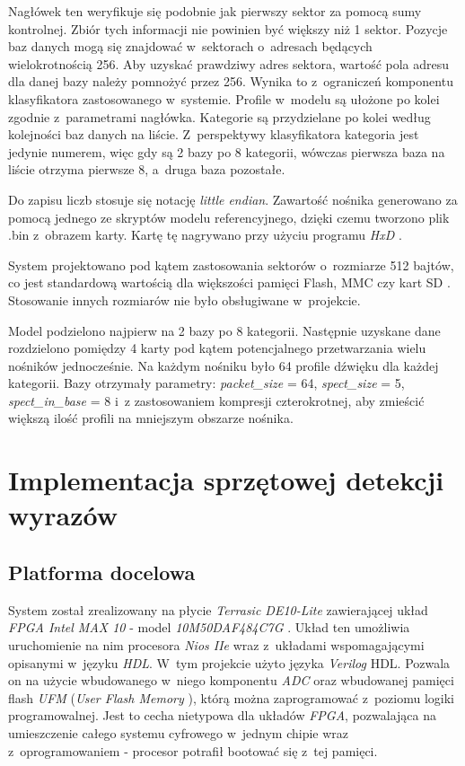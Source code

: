 Nagłówek ten weryfikuje się podobnie jak pierwszy sektor za pomocą sumy kontrolnej. Zbiór tych informacji nie powinien być większy niż 1 sektor. Pozycje baz danych mogą się znajdować w~sektorach o~adresach będących wielokrotnością 256. Aby uzyskać prawdziwy adres sektora, wartość pola adresu dla danej bazy należy pomnożyć przez 256. Wynika to z~ograniczeń komponentu klasyfikatora zastosowanego w~systemie. Profile w~modelu są ułożone po kolei zgodnie z~parametrami nagłówka. Kategorie są przydzielane po kolei według kolejności baz danych na liście. Z~perspektywy klasyfikatora kategoria jest jedynie numerem, więc gdy są 2 bazy po 8 kategorii, wówczas pierwsza baza na liście otrzyma pierwsze 8, a~druga baza pozostałe.

Do zapisu liczb stosuje się notację \textit{little endian}. Zawartość nośnika generowano za pomocą jednego ze skryptów modelu referencyjnego, dzięki czemu tworzono plik .bin z~obrazem karty. Kartę tę nagrywano przy użyciu programu \textit{HxD} \cite{HxD}.

System projektowano pod kątem zastosowania sektorów o~rozmiarze 512 bajtów, co jest standardową wartością dla większości pamięci Flash, MMC czy kart SD \cite{karty:SD}\cite{karty:EMMC}. Stosowanie innych rozmiarów nie było obsługiwane w~projekcie.

Model podzielono najpierw na 2 bazy po 8 kategorii. Następnie uzyskane dane rozdzielono pomiędzy 4 karty pod kątem potencjalnego przetwarzania wielu nośników jednocześnie. Na każdym nośniku było 64 profile dźwięku dla każdej kategorii. Bazy otrzymały parametry: \textit{packet\_size} = 64, \textit{spect\_size} = 5, \textit{spect\_in\_base} = 8 i~z zastosowaniem kompresji czterokrotnej, aby zmieścić większą ilość profili na mniejszym obszarze nośnika.

\newpage
\section{Implementacja sprzętowej detekcji wyrazów}

\subsection{Platforma docelowa}

System został zrealizowany na płycie \textit{Terrasic DE10-Lite} zawierającej układ \textit{FPGA Intel MAX 10} - model \textit{10M50DAF484C7G} \cite{Intel:MAX}. Układ ten umożliwia uruchomienie na nim procesora \textit{Nios IIe} wraz z~układami wspomagającymi opisanymi w~języku \textit{HDL}. W~tym projekcie użyto języka \textit{Verilog} HDL. Pozwala on na użycie wbudowanego w~niego komponentu \textit{ADC} oraz wbudowanej pamięci flash \textit{UFM} (\textit{User Flash Memory} \cite{IntelUFM}), którą można zaprogramować z~poziomu logiki programowalnej. Jest to cecha nietypowa dla układów \textit{FPGA}, pozwalająca na umieszczenie całego systemu cyfrowego w~jednym chipie wraz z~oprogramowaniem - procesor potrafił bootować się z~tej pamięci.

